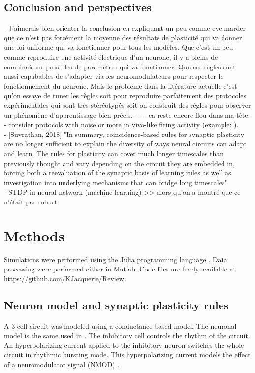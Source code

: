 \subsection{Conclusion and perspectives}
\color{gray}
- J'aimerais bien orienter la conclusion en expliquant un peu comme eve marder que ce n'est pas forcément la moyenne des résultats de plasticité qui va donner une loi uniforme qui va fonctionner pour tous les modèles. 
Que c'est un peu comme reproduire une activité électrique d'un neurone, il y a pleins de combinaisons possibles de paramètres qui va fonctionner. Que ces règles sont aussi capabables de s'adapter via les neuromodulateurs pour respecter le fonctionnement du neurone. Mais le probleme dans la litérature actuelle c'est qu'on essaye de tuner les règles soit pour reproduire parfaitement des protocoles expérimentales qui sont très stéréotypés soit on construit des règles pour observer un phénomène d'apprentissage bien précis. - - - ca reste encore flou dans ma tête. 
- consider protocols with noise or more in vivo-like firing activity (example: \cite{cui_robustness_2018}).\\
- [Suvrathan, 2018] "In summary, coincidence-based rules for synaptic plasticity are no longer sufficient to explain the diversity of ways neural circuits can adapt and learn. The rules for plasticity can cover much longer timescales than previously thought and vary depending on the circuit they are embedded in, forcing both a reevaluation of the synaptic basis of learning rules as well as investigation into underlying mechanisms that can bridge long timescales"\\
- STDP in neural network (machine learning) >>  alors qu'on a montré que ce n'était pas robust 



\color{black}

\section{Methods}
\label{sec: methods}
Simulations were performed using the Julia programming language \cite{bezanson_julia_2017}. Data processing were performed either in Matlab. Code files are freely available at \url{https://github.com/KJacquerie/Review}.


\subsection{Neuron model and synaptic plasticity rules}
\label{sec: plasticity}
A 3-cell circuit was modeled using a conductance-based model. The neuronal model is the same used in \citep{jacquerie_switches_2022}. The inhibitory cell controls the rhythm of the circuit. An hyperpolarizing current applied to the inhibitory neuron switches the whole circuit in rhythmic bursting mode. This hyperpolarizing current models the effect of a neuromodulator signal (NMOD) \citep{zagha_neural_2014}. 

